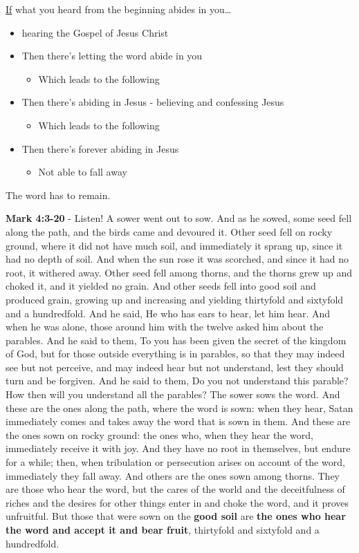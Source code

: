 \documentclass[11pt]{article}
\begin{document}
\uline{If} what you heard from the beginning abides in you\ldots{}

\begin{itemize}
\item hearing the Gospel of Jesus Christ
\item Then there's letting the word abide in you
\begin{itemize}
\item Which leads to the following
\end{itemize}
\item Then there's abiding in Jesus - believing and confessing Jesus
\begin{itemize}
\item Which leads to the following
\end{itemize}
\item Then there's forever abiding in Jesus
\begin{itemize}
\item Not able to fall away
\end{itemize}
\end{itemize}

The word has to remain.

\textbf{Mark 4:3-20} - Listen! A sower went out to sow.  And as he sowed, some seed fell along the path, and the birds came and devoured it.  Other seed fell on rocky ground, where it did not have much soil, and immediately it sprang up, since it had no depth of soil.  And when the sun rose it was scorched, and since it had no root, it withered away.  Other seed fell among thorns, and the thorns grew up and choked it, and it yielded no grain.  And other seeds fell into good soil and produced grain, growing up and increasing and yielding thirtyfold and sixtyfold and a hundredfold.  And he said, He who has ears to hear, let him hear.  And when he was alone, those around him with the twelve asked him about the parables.  And he said to them, To you has been given the secret of the kingdom of God, but for those outside everything is in parables, so that they may indeed see but not perceive, and may indeed hear but not understand, lest they should turn and be forgiven.  And he said to them, Do you not understand this parable? How then will you understand all the parables?  The sower sows the word.  And these are the ones along the path, where the word is sown: when they hear, Satan immediately comes and takes away the word that is sown in them.  And these are the ones sown on rocky ground: the ones who, when they hear the word, immediately receive it with joy.  And they have no root in themselves, but endure for a while; then, when tribulation or persecution arises on account of the word, immediately they fall away.  And others are the ones sown among thorns. They are those who hear the word, but the cares of the world and the deceitfulness of riches and the desires for other things enter in and choke the word, and it proves unfruitful.  But those that were sown on the \textbf{good soil} are \textbf{the ones who hear the word and accept it and bear fruit}, thirtyfold and sixtyfold and a hundredfold.
\end{document}
